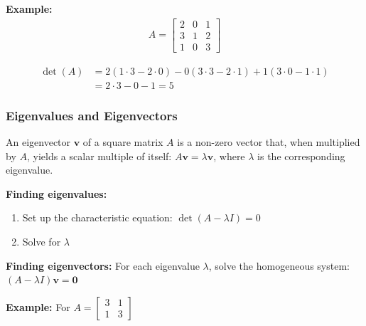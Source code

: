 \documentclass{article}
\begin{document}
\textbf{Example:}
\begin{align}
A = \begin{bmatrix} 
2 & 0 & 1 \\
3 & 1 & 2 \\
1 & 0 & 3
\end{bmatrix}
\end{align}

\begin{align}
\det(A) &= 2(1 \cdot 3 - 2 \cdot 0) - 0(3 \cdot 3 - 2 \cdot 1) + 1(3 \cdot 0 - 1 \cdot 1)\\
&= 2 \cdot 3 - 0 - 1 = 5
\end{align}

\subsubsection{Eigenvalues and Eigenvectors}
An eigenvector $\mathbf{v}$ of a square matrix $A$ is a non-zero vector that, when multiplied by $A$, yields a scalar multiple of itself: $A\mathbf{v} = \lambda\mathbf{v}$, where $\lambda$ is the corresponding eigenvalue.

\textbf{Finding eigenvalues:}
\begin{enumerate}
    \item Set up the characteristic equation: $\det(A - \lambda I) = 0$
    \item Solve for $\lambda$
\end{enumerate}

\textbf{Finding eigenvectors:}
For each eigenvalue $\lambda$, solve the homogeneous system: $(A - \lambda I)\mathbf{v} = \mathbf{0}$

\textbf{Example:}
For $A = \begin{bmatrix} 3 & 1 \\ 1 & 3 \end{bmatrix}$
\end{document}
